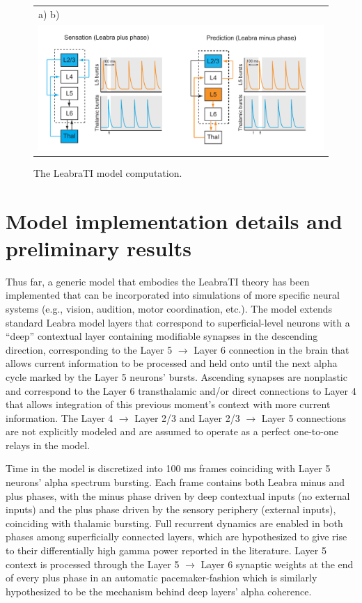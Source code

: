 \documentclass[defaultstyle,12pt]{thesis}
\begin{document}
{%
\begin{figure}[h]
\centering
\begin{tabular}{ll}
a) \hspace{76mm} b) \\
\multicolumn{2}{c}{\includegraphics[width=160mm]{leabrati_comp.pdf}} \\
\end{tabular}
\caption{The LeabraTI model computation.}
\label{fig:leabrati_comp}
\end{figure}

\section{Model implementation details and preliminary results}
Thus far, a generic model that embodies the LeabraTI theory has been implemented that can be incorporated into simulations of more specific neural systems (e.g., vision, audition, motor coordination, etc.). The model extends standard Leabra model layers that correspond to superficial-level neurons with a ``deep'' contextual layer containing modifiable synapses in the descending direction, corresponding to the Layer 5 $\rightarrow$ Layer 6 connection in the brain that allows current information to be processed and held onto until the next alpha cycle marked by the Layer 5 neurons' bursts. Ascending synapses are nonplastic and correspond to the Layer 6 transthalamic and/or direct connections to Layer 4 that allows integration of this previous moment's context with more current information. The Layer 4 $\rightarrow$ Layer 2/3 and Layer 2/3 $\rightarrow$ Layer 5 connections are not explicitly modeled and are assumed to operate as a perfect one-to-one relays in the model.

Time in the model is discretized into 100 ms frames coinciding with Layer 5 neurons' alpha spectrum bursting. Each frame contains both Leabra minus and plus phases, with the minus phase driven by deep contextual inputs (no external inputs) and the plus phase driven by the sensory periphery (external inputs), coinciding with thalamic bursting. Full recurrent dynamics are enabled in both phases among superficially connected layers, which are hypothesized to give rise to their differentially high gamma power reported in the literature. Layer 5 context is processed through the Layer 5 $\rightarrow$ Layer 6 synaptic weights at the end of every plus phase in an automatic pacemaker-fashion which is similarly hypothesized to be the mechanism behind deep layers' alpha coherence.

}
\end{document}
